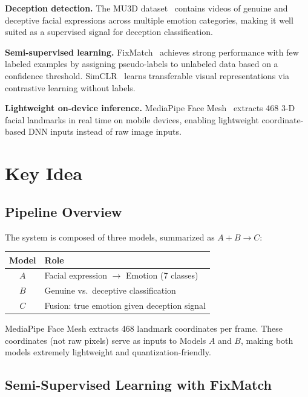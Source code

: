 \documentclass[10pt]{article}
\begin{document}
\textbf{Deception detection.}
The MU3D dataset~\cite{lloyd2019mu3d} contains videos of genuine and deceptive facial
expressions across multiple emotion categories, making it well suited as a
supervised signal for deception classification.

\textbf{Semi-supervised learning.}
FixMatch~\cite{sohn2020fixmatch} achieves strong performance with few labeled examples
by assigning pseudo-labels to unlabeled data based on a confidence threshold.
SimCLR~\cite{chen2020simclr} learns transferable visual representations via
contrastive learning without labels.

\textbf{Lightweight on-device inference.}
MediaPipe Face Mesh~\cite{lugaresi2019mediapipe} extracts 468 3-D facial landmarks
in real time on mobile devices, enabling lightweight coordinate-based DNN inputs
instead of raw image inputs.

\section{Key Idea}

\subsection{Pipeline Overview}

The system is composed of three models, summarized as $A + B \rightarrow C$:

\begin{center}
\small
\begin{tabular}{cl}
\toprule
\textbf{Model} & \textbf{Role} \\
\midrule
$A$ & Facial expression $\rightarrow$ Emotion (7 classes) \\
$B$ & Genuine vs.\ deceptive classification \\
$C$ & Fusion: true emotion given deception signal \\
\bottomrule
\end{tabular}
\end{center}

\vspace{4pt}
MediaPipe Face Mesh extracts 468 landmark coordinates per frame. These coordinates
(not raw pixels) serve as inputs to Models $A$ and $B$, making both models extremely
lightweight and quantization-friendly.

\subsection{Semi-Supervised Learning with FixMatch}
\end{document}
